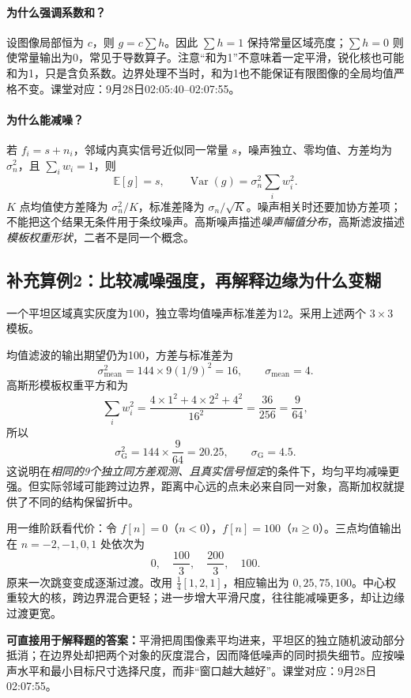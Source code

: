 \paragraph{为什么强调系数和？}
设图像局部恒为 $c$，则 $g=c\sum h$。因此 $\sum h=1$ 保持常量区域亮度；$\sum h=0$ 则使常量输出为0，常见于导数算子。注意“和为1”不意味着一定平滑，锐化核也可能和为1，只是含负系数。边界处理不当时，和为1也不能保证有限图像的全局均值严格不变。课堂对应：9月28日02:05:40--02:07:55。

\paragraph{为什么能减噪？}
若 $f_i=s+n_i$，邻域内真实信号近似同一常量 $s$，噪声独立、零均值、方差均为 $\sigma_n^2$，且 $\sum_iw_i=1$，则
\[
\mathbb E[g]=s,\qquad \operatorname{Var}(g)=\sigma_n^2\sum_iw_i^2.
\]
$K$ 点均值使方差降为 $\sigma_n^2/K$，标准差降为 $\sigma_n/\sqrt K$。噪声相关时还要加协方差项；不能把这个结果无条件用于条纹噪声。高斯噪声描述\emph{噪声幅值分布}，高斯滤波描述\emph{模板权重形状}，二者不是同一个概念。

\subsection{补充算例2：比较减噪强度，再解释边缘为什么变糊}
一个平坦区域真实灰度为100，独立零均值噪声标准差为12。采用上述两个 $3\times3$ 模板。

均值滤波的输出期望仍为100，方差与标准差为
\[
\sigma_{\mathrm{mean}}^2=144\times9(1/9)^2=16,\qquad
\sigma_{\mathrm{mean}}=4.
\]
高斯形模板权重平方和为
\[
\sum_iw_i^2=\frac{4\times1^2+4\times2^2+4^2}{16^2}
=\frac{36}{256}=\frac9{64},
\]
所以
\[
\sigma_{\mathrm G}^2=144\times\frac9{64}=20.25,\qquad
\sigma_{\mathrm G}=4.5.
\]
这说明在\emph{相同的9个独立同方差观测、且真实信号恒定}的条件下，均匀平均减噪更强。但实际邻域可能跨过边界，距离中心远的点未必来自同一对象，高斯加权就提供了不同的结构保留折中。

用一维阶跃看代价：令 $f[n]=0$（$n<0$），$f[n]=100$（$n\geq0$）。三点均值输出在 $n=-2,-1,0,1$ 处依次为
\[
0,\quad \frac{100}{3},\quad \frac{200}{3},\quad100.
\]
原来一次跳变变成逐渐过渡。改用 $\frac14[1,2,1]$，相应输出为 $0,25,75,100$。中心权重较大的核，跨边界混合更轻；进一步增大平滑尺度，往往能减噪更多，却让边缘过渡更宽。

\textbf{可直接用于解释题的答案：}平滑把周围像素平均进来，平坦区的独立随机波动部分抵消；在边界处却把两个对象的灰度混合，因而降低噪声的同时损失细节。应按噪声水平和最小目标尺寸选择尺度，而非“窗口越大越好”。课堂对应：9月28日02:07:55。

